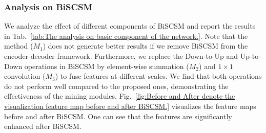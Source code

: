 \documentclass[letterpaper]{article} %
\begin{document}
\subsubsection{Analysis on BiSCSM}
%
We analyze the effect of different components of BiSCSM and report the results in Tab.~\ref{tab:The analysis on basic component of the network.}.
Note that the method ($M_{1}$) does not generate better results if we remove BiSCSM from the encoder-decoder framework.
Furthermore, we replace the Down-to-Up and Up-to-Down operations in BiSCSM by element-wise summation ($M_{2}$) and $1 \times 1$ convolution ($M_{3}$) to fuse features at different scales.
%
We find that both operations do not perform well compared to the proposed ones, demonstrating the effectiveness of the mining modules.
%
Fig.~\ref{fig:Before and After denote the visualization feature map before and after BiSCSM.}
visualizes the feature maps before and after BiSCSM.
%
One can see that the features are significantly enhanced after BiSCSM. %
\begin{table}[!t]%
{}
\caption{Ablation study of BiSCSM.
		\CheckmarkBold and \XSolidBrush denote that the corresponding component is adopted and not adopted, respectively.}
\label{tab:The analysis on basic component of the network.}
\end{table}
\end{document}
